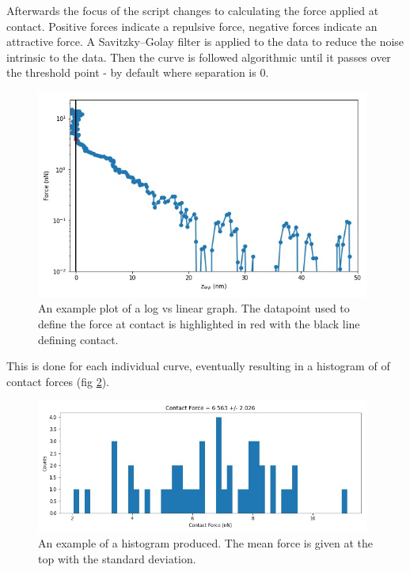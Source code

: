 
Afterwards the focus of the script changes to calculating the force applied at contact. Positive forces indicate a repulsive force, negative forces indicate an attractive force. A Savitzky–Golay filter is applied to the data to reduce the noise intrinsic to the data. Then the curve is followed algorithmic until it passes over the threshold point - by default where separation is 0.

\newpage %

\begin{figure}[h!!!!!!!!!!!!!!!!!!!!!!!!!!!!]     %
        \begin{center}
          \includegraphics[width=110mm]{chapter4/LogLinEgForceContact.jpg}
\end{center}
\caption{An example plot of a log vs linear graph. The datapoint used to define the force at contact is highlighted in red with the black line defining contact.}
\label{fig:LogLinEgForceContact}                 %
\end{figure}

This is done for each individual curve, eventually resulting in a histogram of of contact forces (fig \ref{fig:EgForceHisto}).

\begin{figure}[h!!!]     %
        \begin{center}
          \includegraphics[width=110mm]{chapter4/EgForceHisto.jpg}
\end{center}
\caption{An example of a histogram produced. The mean force is given at the top with the standard deviation.}
\label{fig:EgForceHisto}                 %
\end{figure}

